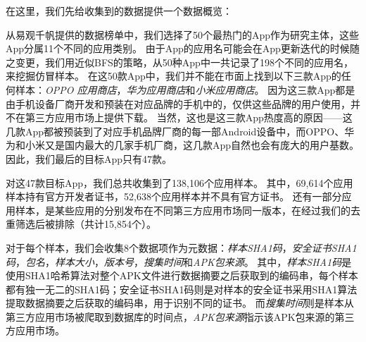 在这里，我们先给收集到的数据提供一个数据概览：

从易观千帆提供的数据榜单中，我们选择了50个最热门的App作为研究主体，这些App分属11个不同的应用类别。
由于App的应用名可能会在App更新迭代的时候随之变更，我们用近似BFS的策略，从50种App中一共记录了198个不同的应用名，来挖掘仿冒样本。
在这50款App中，我们并不能在市面上找到以下三款App的任何样本：\emph{OPPO 应用商店}，\emph{华为应用商店}和\emph{小米应用商店}。
因为这三款App都是由手机设备厂商开发和预装在对应品牌的手机中的，仅供这些品牌的用户使用，并不在第三方应用市场上提供下载。
当然，这也是这三款App热度高的原因——这几款App都被预装到了对应手机品牌厂商的每一部Android设备中，而OPPO、华为和小米又是国内最大的几家手机厂商，这几款App自然也会有庞大的用户基数。
因此，我们最后的目标App只有47款。

对这47款目标App，我们总共收集到了138,106个应用样本。
其中，69,614个应用样本持有官方开发者证书，52,638个应用样本并不具有官方证书。
还有一部分应用样本，是某些应用的分别发布在不同第三方应用市场同一版本，在经过我们的去重筛选后被排除（共计15,854个）。

对于每个样本，我们会收集8个数据项作为元数据：\emph{样本SHA1码}，\emph{安全证书SHA1码}，\emph{包名}，\emph{样本大小}，\emph{版本号}，\emph{搜集时间}和\emph{APK包来源}。
其中，\emph{样本SHA1码}是使用SHA1哈希算法对整个APK文件进行数据摘要之后获取到的编码串，每个样本都有独一无二的SHA1码；安全证书SHA1码则是对样本的安全证书采用SHA1算法提取数据摘要之后获取的编码串，用于识别不同的证书。
而\emph{搜集时间}则是样本从第三方应用市场被爬取到数据库的时间点，\emph{APK包来源}指示该APK包来源的第三方应用市场。

